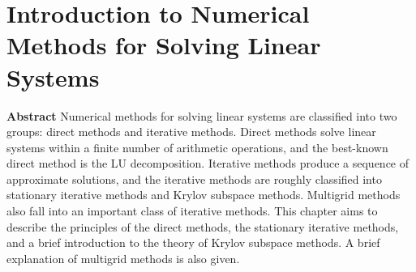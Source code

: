\section{{Introduction to Numerical Methods for Solving Linear Systems}}\label{chap:linear-systems-introduction}
\noindent\textbf{{Abstract}}\quad
{Numerical methods for solving linear systems are classified into two groups: direct methods and iterative methods. Direct methods solve linear systems within a finite number of arithmetic operations, and the best-known direct method is the LU decomposition. Iterative methods produce a sequence of approximate solutions, and the iterative methods are roughly classified into stationary iterative methods and Krylov subspace methods. Multigrid methods also fall into an important class of iterative methods. This chapter aims to describe the principles of the direct methods, the stationary iterative methods, and a brief introduction to the theory of Krylov subspace methods. A brief explanation of multigrid methods is also given.}
